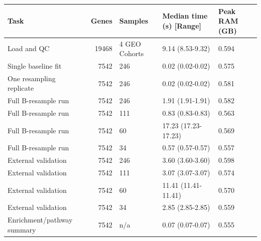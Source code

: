\begin{tabular}{lrlll}
\toprule
Task & Genes & Samples & Median time (s) [Range] & Peak RAM (GB) \\
\midrule
Load and QC & 19468 & 4 GEO Cohorts & 9.14 (8.53-9.32) & 0.594 \\
Single baseline fit & 7542 & 246 & 0.02 (0.02-0.02) & 0.575 \\
One resampling replicate & 7542 & 246 & 0.02 (0.02-0.02) & 0.581 \\
Full B-resample run & 7542 & 246 & 1.91 (1.91-1.91) & 0.582 \\
Full B-resample run & 7542 & 111 & 0.83 (0.83-0.83) & 0.563 \\
Full B-resample run & 7542 & 60 & 17.23 (17.23-17.23) & 0.569 \\
Full B-resample run & 7542 & 34 & 0.57 (0.57-0.57) & 0.557 \\
External validation & 7542 & 246 & 3.60 (3.60-3.60) & 0.598 \\
External validation & 7542 & 111 & 3.07 (3.07-3.07) & 0.574 \\
External validation & 7542 & 60 & 11.41 (11.41-11.41) & 0.570 \\
External validation & 7542 & 34 & 2.85 (2.85-2.85) & 0.559 \\
Enrichment/pathway summary & 7542 & n/a & 0.07 (0.07-0.07) & 0.555 \\
\bottomrule
\end{tabular}
